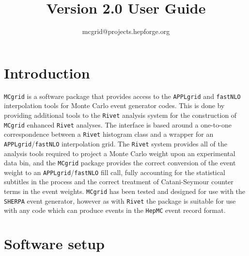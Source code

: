 \documentclass[11pt]{article}
\title{\mcgrid Version 2.0 User Guide}
\author{mcgrid@projects.hepforge.org}
\newcommand{\mcgrid} {{\tt MCgrid}\xspace}
\newcommand{\rivet} {{\tt Rivet}\xspace}
\newcommand{\appl} {{\tt APPLgrid}\xspace}
\newcommand{\fnlo} {{\tt fastNLO}\xspace}
\newcommand{\sherpa} {{\tt SHERPA}\xspace}
\begin{document}
\date{}
\maketitle
\tableofcontents
\section{Introduction}
\mcgrid is a software package that provides access to the \appl and \fnlo interpolation tools for Monte Carlo event generator codes. This is done by providing additional tools to the \rivet analysis system for the construction of \mcgrid enhanced \rivet analyses. The interface is based around a one-to-one correspondence between a \rivet histogram class and a wrapper for an \appl/\fnlo interpolation grid. The \rivet system provides all of the analysis tools required to project a Monte Carlo weight upon an experimental data bin, and the \mcgrid package provides the correct conversion of the event weight to an \appl/\fnlo fill call, fully accounting for the statistical subtitles in the process and the correct treatment of Catani-Seymour counter terms in the event weights. \mcgrid has been tested and designed for use with the \sherpa event generator, however as with \rivet the package is suitable for use with any code which can produce events in the {\tt HepMC} event record format.
\clearpage

\section{Software setup}
\end{document}
